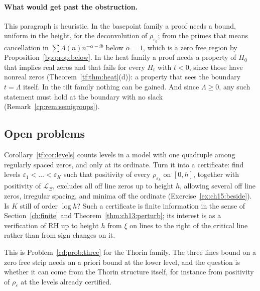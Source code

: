 \paragraph{What would get past the obstruction.}\makeatletter\protected@edef\@currentlabel{\thesection}\makeatother{}\label{tf:sec:past} This paragraph is heuristic. In the basepoint family a proof needs a bound, uniform in the height, for the deconvolution of $\rho_{\varepsilon_0}$; from the primes that means cancellation in $\sum\Lambda(n)n^{-\alpha-ib}$ below $\alpha=1$, which is a zero free region by Proposition~\ref{bp:prop:below}. In the heat family a proof needs a property of $H_0$ that implies real zeros and that fails for every $H_t$ with $t<0$, since those have nonreal zeros (Theorem~\ref{tf:thm:heat}(d)): a property that sees the boundary $t=\Lambda$ itself. In the tilt family nothing can be gained. And since $\Lambda\ge0$, any such statement must hold at the boundary with no slack (Remark~\ref{cp:rem:semigroups}).

\subsection{Open problems}\label{tf:sec:open}

\begin{problem}\label{tf:prob:levels}
Corollary~\ref{tf:cor:levels} counts levels in a model with one quadruple among regularly spaced zeros, and only at its ordinate. Turn it into a certificate: find levels $\varepsilon_1<\dots<\varepsilon_K$ such that positivity of every $\rho_{\varepsilon_k}$ on $[0,h]$, together with positivity of $\mathcal L_\Xi$, excludes all off line zeros up to height $h$, allowing several off line zeros, irregular spacing, and minima off the ordinate (Exercise~\ref{ex:ch15:beside}). Is $K$ still of order $\log h$? Such a certificate is finite information in the sense of Section~\ref{ch:finite} and Theorem~\ref{thm:ch13:perturb}; its interest is as a verification of RH up to height $h$ from $\xi$ on lines to the right of the critical line rather than from sign changes on it.
\end{problem}

\begin{problem}\label{tf:prob:three}
This is Problem~\ref{cd:prob:three} for the Thorin family. The three lines bound on a zero free strip needs an a priori bound at the lower level, and the question is whether it can come from the Thorin structure itself, for instance from positivity of $\rho_\varepsilon$ at the levels already certified.
\end{problem}

